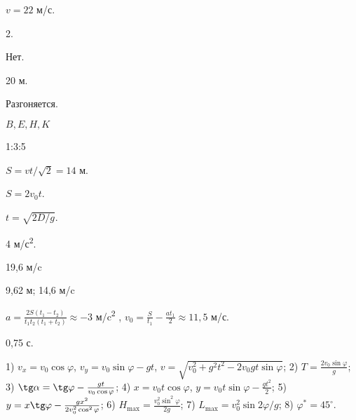 \begin{Answer}{1}
$v = 22$ м/с.
\end{Answer}
\begin{Answer}{2}
\end{Answer}
\begin{Answer}{3}
2.
\end{Answer}
\begin{Answer}{4}
Нет.
\end{Answer}
\begin{Answer}{5}
20 м.
\end{Answer}
\begin{Answer}{6}
Разгоняется.
\end{Answer}
\begin{Answer}{7}
$B, E, H, K$
\end{Answer}
\begin{Answer}{8}
1:3:5
\end{Answer}
\begin{Answer}{9}
\end{Answer}
\begin{Answer}{10}
\end{Answer}
\begin{Answer}{11}
$S = vt/\sqrt{2} = 14$ м.
\end{Answer}
\begin{Answer}{12}
$S = 2 v_0 t$.
\end{Answer}
\begin{Answer}{13}
$t = \sqrt{2D/g}$.
\end{Answer}
\begin{Answer}{14}
\end{Answer}
\begin{Answer}{15}
4 м/с\textsuperscript{2}.
\end{Answer}
\begin{Answer}{16}
\end{Answer}
\begin{Answer}{17}
19,6 м/c
\end{Answer}
\begin{Answer}{18}
9,62 м; 14,6 м/c
\end{Answer}
\begin{Answer}{19}
$a = \frac{2S\left(t_1-t_2\right)}{t_1t_2\left(t_1+t_2\right)} \approx -3$ м/c\textsuperscript{2} , $v_0 = \frac{S}{t_1}-\frac{at_1}{2} \approx 11,5$ м/с.
\end{Answer}
\begin{Answer}{20}
0,75 с.
\end{Answer}
\begin{Answer}{21}
1) $v_x = v_0 \cos \varphi$, $v_y = v_0 \sin \varphi - gt$, $v = \sqrt{v_{0}^{2} + g^2 t^2 - 2v_{0}gt \sin \varphi}$; 2) $T = \frac{2v_{0}\sin \varphi}{g}$; 3) $ \tg \alpha = \tg \varphi - \frac{gt}{v_0 \cos \varphi}$; 4) $x = v_0 t \cos \varphi$, $y = v_0 t \sin \varphi - \frac{gt^2}{2}$; 5) $y = x \tg \varphi - \frac{gx^2}{2v_{0}^{2} \cos^2 \varphi} $; 6) $H_{\max} = \frac{v_{0}^{2} \sin^2 \varphi}{2g}$; 7) $L_{\max} = v_{0}^2 \sin 2 \varphi / g$; 8) $\varphi^{*} = 45^{\circ}$.
\end{Answer}
